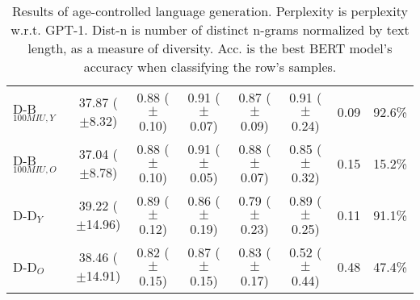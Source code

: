 \begin{table*}[h]
\begin{tabular}{l | c c c c | c c c}
    D-B$_{100MIU, Y}$ & 37.87 ($\pm$8.32) & 0.88 ($\pm$0.10) & 0.91 ($\pm$0.07) & 0.87 ($\pm$0.09) & 0.91 ($\pm$0.24) & 0.09 & 92.6\%\\
    D-B$_{100MIU, O}$ & 37.04 ($\pm$8.78) & 0.88 ($\pm$0.10) & 0.91 ($\pm$0.05) & 0.88 ($\pm$0.07) & 0.85 ($\pm$0.32) & 0.15 & 15.2\%\\
    \midrule
    D-D$_{Y}$ & 39.22 ($\pm$14.96) & 0.89 ($\pm$0.12) & 0.86 ($\pm$0.19) & 0.79 ($\pm$0.23) & 0.89 ($\pm$0.25) & 0.11 & 91.1\%\\
    D-D$_{O}$ & 38.46 ($\pm$14.91) & 0.82 ($\pm$0.15) & 0.87 ($\pm$0.15) & 0.83 ($\pm$0.17) & 0.52 ($\pm$0.44) & 0.48 & 47.4\%\\
    \bottomrule
    \end{tabular}
    \caption{ Results of age-controlled language generation. Perplexity is perplexity w.r.t. GPT-1. Dist-n is number of distinct n-grams normalized by text length, as a measure of diversity. Acc. is the best BERT model's accuracy when classifying the row's samples.}
    \label{tab:ctg_results_ws_young_prompt}
\end{table*}

